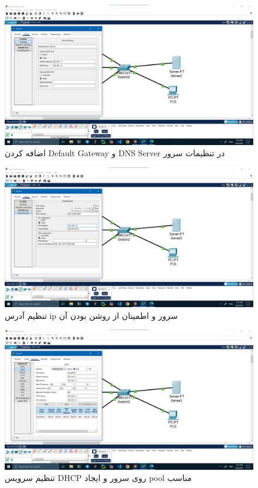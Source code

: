 \documentclass[12pt]{article}
\begin{document}
	\begin{figure}[H]
		\centering
		\includegraphics[width=\textwidth]{resources/scenario1-4.png}
		\caption{اضافه کردن \textenglish{Default Gateway} و \textenglish{DNS Server} در تنظیمات سرور}
		\label{1:4}
	\end{figure}
	\begin{figure}[H]
		\centering
		\includegraphics[width=\textwidth]{resources/scenario1-5.png}
		\caption{تنظیم آدرس \textenglish{ip} سرور و اطمینان از روشن بودن آن}
		\label{1:5}
	\end{figure}
	\begin{figure}[H]
		\centering
		\includegraphics[width=\textwidth]{resources/scenario1-6.png}
		\caption{تنظیم سرویس \textenglish{DHCP} روی سرور و ایجاد \textenglish{pool} مناسب}
		\label{1:6}
	\end{figure}
\end{document}
